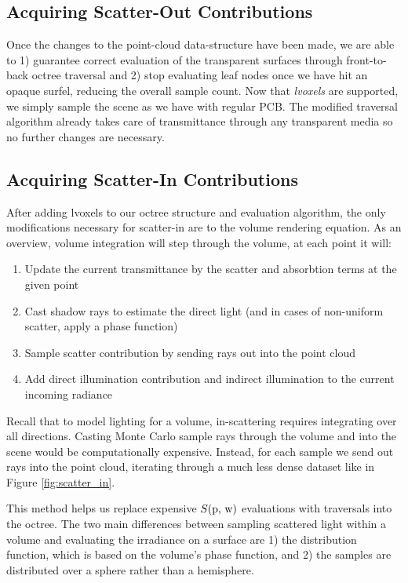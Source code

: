 \documentclass[12pt]{ucthesis}
\begin{document}
\subsection{Acquiring Scatter-Out Contributions}
\label{scatterout_sec}

Once the changes to the point-cloud data-structure have been made, we are able to 1) guarantee correct evaluation of the transparent surfaces through front-to-back octree traversal and 2) stop evaluating leaf nodes once we have hit an opaque surfel, reducing the overall sample count.  Now that \textit{lvoxels} are supported, we simply sample the scene as we have with regular PCB.  The modified traversal algorithm already takes care of transmittance through any transparent media so no further changes are necessary.

\subsection{Acquiring Scatter-In Contributions}
\label{scatterin_sec}
After adding lvoxels to our octree structure and evaluation algorithm, the only modifications necessary for scatter-in are to the volume rendering equation.  As an overview, volume integration will step through the volume, at each point it will:

\begin{enumerate}
\item Update the current transmittance by the scatter and absorbtion terms at the given point
\item Cast shadow rays to estimate the direct light (and in cases of non-uniform scatter, apply a phase function)
\item Sample scatter contribution by sending rays out into the point cloud
\item Add direct illumination contribution and indirect illumination to the current incoming radiance
\end{enumerate}

Recall that to model lighting for a volume, in-scattering requires integrating over all directions.  Casting Monte Carlo sample rays through the volume and into the scene would be computationally expensive.  Instead, for each sample we send out rays into the point cloud, iterating through a much less dense dataset like in Figure \ref{fig:scatter_in}.

This method helps us replace expensive $S(\textup{p, w})$ evaluations with traversals into the octree.  The two main differences between sampling scattered light within a volume and evaluating the irradiance on a surface are 1) the distribution function, which is based on the volume's phase function, and 2) the samples are distributed over a sphere rather than a hemisphere.
\end{document}
